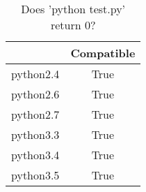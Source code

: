 \begin{table}[htp]
	\begin{center}
	\caption{Does 'python test.py' return 0?}
	\label{tab:compatibleTable}
		\begin{tabular}{rc}
		\toprule
			{} & {Compatible}\\
			\midrule
			{python2.4} & True\\
			{python2.6} & True\\
			{python2.7} & True\\
			{python3.3} & True\\
			{python3.4} & True\\
			{python3.5} & True\\
		\bottomrule
		\end{tabular}
	\end{center}
\end{table}